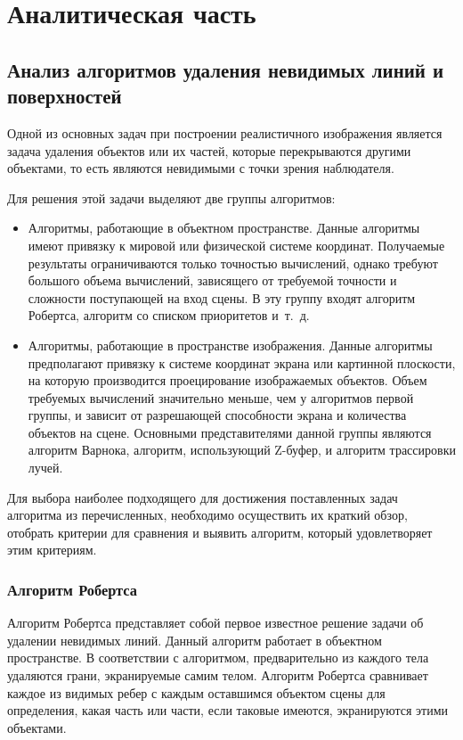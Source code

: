 \chapter{Аналитическая часть}

\section{Анализ алгоритмов удаления невидимых линий и поверхностей}

Одной из основных задач при построении реалистичного изображения является задача удаления объектов или их частей, которые перекрываются другими объектами, то есть являются невидимыми с точки зрения наблюдателя.

Для решения этой задачи выделяют две группы алгоритмов:
\begin{itemize}
	\item Алгоритмы, работающие в объектном пространстве.
	Данные алгоритмы имеют привязку к мировой или физической системе координат.
	Получаемые результаты ограничиваются только точностью вычислений, однако требуют большого объема вычислений, зависящего от требуемой точности и сложности поступающей на вход сцены.
	В эту группу входят алгоритм Робертса, алгоритм со списком приоритетов и~т.~д.

	\item Алгоритмы, работающие в пространстве изображения.
	Данные алгоритмы предполагают привязку к системе координат экрана или картинной плоскости, на которую производится проецирование изображаемых объектов.
	Объем требуемых вычислений значительно меньше, чем у алгоритмов первой группы, и зависит от разрешающей способности экрана и количества объектов на сцене.
	Основными представителями данной группы являются алгоритм Варнока, алгоритм, использующий Z-буфер, и алгоритм трассировки лучей. \cite{Rogers}
\end{itemize}

Для выбора наиболее подходящего для достижения поставленных задач алгоритма из перечисленных, необходимо осуществить их краткий обзор, отобрать критерии для сравнения и выявить алгоритм, который удовлетворяет этим критериям.

\subsection{Алгоритм Робертса}

Алгоритм Робертса представляет собой первое известное решение задачи об удалении невидимых линий.
Данный алгоритм работает в объектном пространстве.
В соответствии с алгоритмом, предварительно из каждого тела удаляются грани, экранируемые самим телом.
Алгоритм Робертса сравнивает каждое из видимых ребер с каждым оставшимся объектом сцены для определения, какая часть или части, если таковые имеются, экранируются этими объектами.

